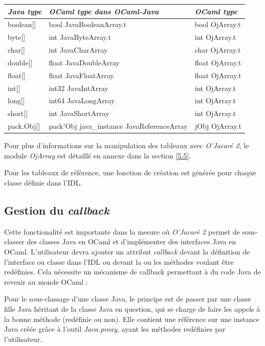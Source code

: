 \documentclass[a4paper, 11pt]{article}
\begin{document}
\begin{tabular}{|l|l|l|}
  \hline
  \emph{Java type} & \emph{OCaml type dans OCaml-Java} & \emph{OCaml type}\\ 
  \hline
  boolean[] & bool JavaBooleanArray.t & bool OjArray.t \\
  byte[] & int JavaByteArray.t & int OjArray.t \\
  char[] & int JavaCharArray   & char OjArray.t \\
  double[] & float JavaDoubleArray & float OjArray.t \\
  float[] & float JavaFloatArray & float OjArray.t \\
  int[] & int32 JavaIntArray & int OjArray.t \\
  long[] & int64 JavaLongArray & int OjArray.t \\
  short[] & int JavaShortArray & int OjArray.t \\
  pack.Obj[] & pack'Obj java\_instance JavaReferenceArray & jObj OjArray.t \\
  \hline
\end{tabular}
\newline

Pour plus d'informations sur la manipulation des tableaux avec \emph{O'Jacaré 2}, le module \emph{OjArray} est détaillé en annexe dans la section \ref{5.5}.

Pour les tableaux de référence, une fonction de création est générée pour chaque classe définie dans l'IDL.

\subsection{Gestion du \emph{callback}}
Cette fonctionalité est importante dans la mesure où 
\emph{O'Jacaré 2} permet de sous-classer des classes Java en OCaml et d'implémenter des interfaces Java en OCaml. 
L'utilisateur devra ajouter un attribut \emph{callback} devant la définition de l'interface ou classe dans l'IDL ou devant la ou les méthodes voulant être redéfinies.
Cela nécessite un mécanisme de callback permettant à du code Java de revenir au monde OCaml :

Pour le sous-classage d'une classe Java, le principe est de passer par une classe fille Java héritant de la classe Java en question, qui se charge de faire les appels à la bonne méthode (redéfinie ou non).
Elle contient une référence sur une instance Java créée grâce à l'outil \emph{Java.proxy}, ayant les méthodes redéfinies par l'utilisateur.
\end{document}
